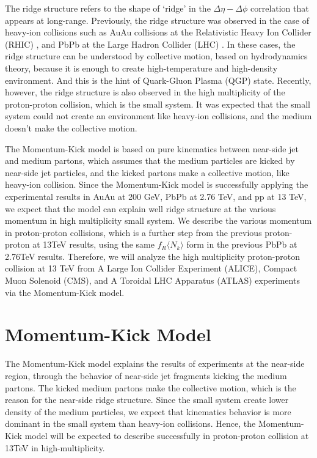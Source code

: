 \documentclass[jkps,fleqn,showpacs,showkeys]{revtex4}
\begin{document}
The ridge structure refers to the shape of ‘ridge’ in the $\Delta\eta - \Delta\phi$ correlation that appears at long-range.
Previously, the ridge structure was observed in the case of heavy-ion collisions such as AuAu collisions at the Relativistic Heavy Ion Collider (RHIC) \cite{ref12, ref13, ref14, ref15, ref16, ref17, ref18, ref19, ref20, ref21, ref22, ref23, ref24, ref25, ref26, ref27}, and PbPb at the Large Hadron Collider (LHC) \cite{ref1, ref2, ref3, ref4, ref5, ref6, ref7, ref8, ref9, ref10, ref11}.
In these cases, the ridge structure can be understood by collective motion, based on hydrodynamics theory, because it is enough to create high-temperature and high-density environment.
And this is the hint of Quark-Gluon Plasma (QGP) state.
Recently, however, the ridge structure is also observed in the high multiplicity of the proton-proton collision, which is the small system.
It was expected that the small system could not create an environment like heavy-ion collisions, and the medium doesn't make the collective motion.

The Momentum-Kick model\cite{Wong_2, Wong_3, Wong_4, Wong_5} is based on pure kinematics between near-side jet and medium partons, which assumes that the medium particles are kicked by near-side jet particles, and the kicked partons make a collective motion, like heavy-ion collision.
Since the Momentum-Kick model is successfully applying the experimental results in AuAu at 200 GeV\cite{Wong_1}, PbPb at 2.76 TeV\cite{PbPb}, and pp at 13 TeV\cite{Hanul}, we expect that the model can explain well ridge structure at the various momentum in high multiplicity small system.
We describe the various momentum in proton-proton collisions, which is a further step from the previous proton-proton at 13TeV results\cite{Hanul}, using the same $f_R \langle N_k \rangle$ form in the previous PbPb at 2.76TeV results\cite{PbPb}.
Therefore, we will analyze the high multiplicity proton-proton collision at 13 TeV from A Large Ion Collider Experiment (ALICE), Compact Muon Solenoid (CMS), and A Toroidal LHC Apparatus (ATLAS) experiments via the Momentum-Kick model\cite{alice,cms,atlas}.

\section*{Momentum-Kick Model}
\label{sec:Momentum-Kick Model}

The Momentum-Kick model explains the results of experiments at the near-side region, through the behavior of near-side jet fragments kicking the medium partons.
The kicked medium partons make the collective motion, which is the reason for the near-side ridge structure.
Since the small system create lower density of the medium particles, we expect that kinematics behavior is more dominant in the small system than heavy-ion collisions.
Hence, the Momentum-Kick model will be expected to describe successfully in proton-proton collision at 13TeV in high-multiplicity.
\end{document}
